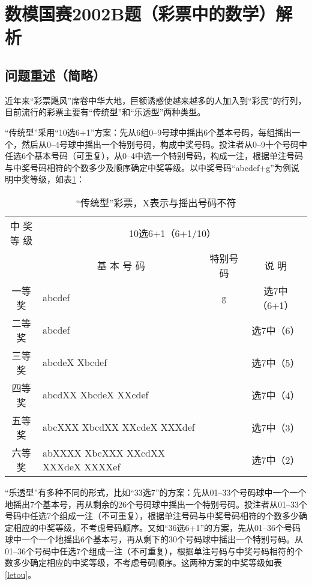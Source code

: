 \section{数模国赛2002B题（彩票中的数学）解析}
\subsection{问题重述（简略）}
	近年来“彩票飓风”席卷中华大地，巨额诱惑使越来越多的人加入到“彩民”的行列，目前流行的彩票主要有“传统型”和“乐透型”两种类型。
	
	“传统型”采用“10选6+1”方案：先从6组0--9号球中摇出6个基本号码，每组摇出一个，然后从0--4号球中摇出一个特别号码，构成中奖号码。投注者从0--9十个号码中任选6个基本号码（可重复），从0--4中选一个特别号码，构成一注，根据单注号码与中奖号码相符的个数多少及顺序确定中奖等级。以中奖号码“abcdef+g”为例说明中奖等级，如表\ref{chuantong}：
	\begin{table}[H]\label{chuantong}
		\centering
		\caption{“传统型”彩票，X表示与摇出号码不符}
		\begin{tabular}{|c|lc|c|}
			\hline
			\multirowcell{2}{中  奖\\等  级} & \multicolumn{3}{c|}{10选6+1（6+1/10）} \\
			\cline{2-4}
			{} & \multicolumn{1}{c}{基 本 号 码} & 特别号码 & 说  明 \\ \hline
			一等奖	& abcdef & g & 选7中（6+1） \\ \hline
			二等奖	& abcdef & {} & 选7中（6） \\ \hline
			三等奖	& abcdeX Xbcdef & {} & 选7中（5） \\ \hline
			四等奖	& abcdXX XbcdeX XXcdef & {} & 选7中（4） \\ \hline
			五等奖	& abcXXX XbcdXX XXcdeX XXXdef & {} & 选7中（3） \\ \hline
			六等奖	& abXXXX XbcXXX XXcdXX XXXdeX XXXXef & {} & 选7中（2） \\ \hline
		\end{tabular}
	\end{table}
	“乐透型”有多种不同的形式，比如“33选7”的方案：先从01--33个号码球中一个一个地摇出7个基本号，再从剩余的26个号码球中摇出一个特别号码。投注者从01--33个号码中任选7个组成一注（不可重复），根据单注号码与中奖号码相符的个数多少确定相应的中奖等级，不考虑号码顺序。又如“36选6+1”的方案，先从01--36个号码球中一个一个地摇出6个基本号，再从剩下的30个号码球中摇出一个特别号码。从01--36个号码中任选7个组成一注（不可重复），根据单注号码与中奖号码相符的个数多少确定相应的中奖等级，不考虑号码顺序。这两种方案的中奖等级如表\ref{letou}。
